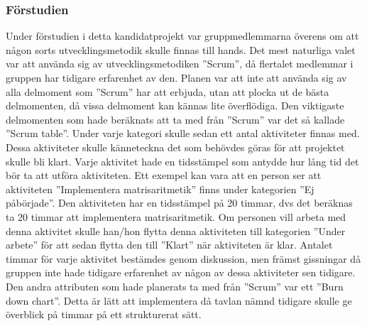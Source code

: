 \subsubsection{Förstudien}
\label{sec:forstudie}
Under förstudien i detta kandidatprojekt var gruppmedlemmarna överens om att någon sorts utvecklingsmetodik skulle finnas till hands. Det mest naturliga valet var att använda sig av utvecklingsmetodiken ''Scrum'', då flertalet medlemmar i gruppen har tidigare erfarenhet av den. 
\newline
\newline
Planen var att inte att använda sig av alla delmoment som ''Scrum'' har att erbjuda, utan att plocka ut de bästa delmomenten, då vissa delmoment kan kännas lite överflödiga. Den viktigaste delmomenten som hade beräknats att ta med från ''Scrum'' var det så kallade ''Scrum table''. Under varje kategori skulle sedan ett antal aktiviteter finnas med. Dessa aktiviteter skulle känneteckna det som behövdes göras för att projektet skulle bli klart. Varje aktivitet hade en tidsstämpel som antydde hur lång tid det bör ta att utföra aktiviteten. Ett exempel kan vara att en person ser att aktiviteten ''Implementera matrisaritmetik'' finns under kategorien ''Ej påbörjade''. Den aktiviteten har en tidsstämpel på 20 timmar, dvs det beräknas ta 20 timmar att implementera matrisaritmetik. Om personen vill arbeta med denna aktivitet skulle han/hon flytta denna aktiviteten till kategorien ''Under arbete'' för att sedan flytta den till ''Klart'' när aktiviteten är klar. Antalet timmar för varje aktivitet bestämdes genom diskussion, men främst gissningar då gruppen inte hade tidigare erfarenhet av någon av dessa aktiviteter sen tidigare.
\newline
\newline
Den andra attributen som hade planerats ta med från ''Scrum'' var ett ''Burn down chart''. Detta är lätt att implementera då tavlan nämnd tidigare skulle ge överblick på timmar på ett strukturerat sätt. 
\newline
\newline
